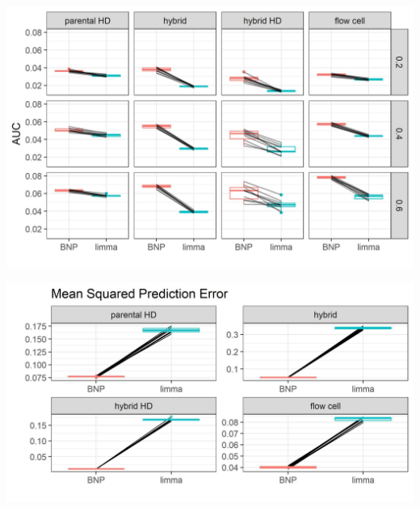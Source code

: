 \documentclass{beamer}
\begin{document}
\begin{frame}
\includegraphics[width=\textwidth]{ss1-auc}
\end{frame}

\begin{frame}[label=current]
\includegraphics[width=\textheight]{ss1-mspe}
\end{frame}
\end{document}
